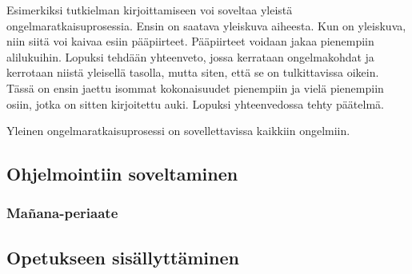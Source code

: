 Esimerkiksi tutkielman kirjoittamiseen voi soveltaa yleistä
ongelmaratkaisuprosessia. Ensin on saatava yleiskuva aiheesta. Kun on yleiskuva,
niin siitä voi kaivaa esiin pääpiirteet. Pääpiirteet voidaan jakaa pienempiin
alilukuihin. Lopuksi tehdään yhteenveto, jossa kerrataan ongelmakohdat ja
kerrotaan niistä yleisellä tasolla, mutta siten, että se on tulkittavissa
oikein. Tässä on ensin jaettu isommat kokonaisuudet pienempiin ja vielä
pienempiin osiin, jotka on sitten kirjoitettu auki. Lopuksi yhteenvedossa tehty
päätelmä.

Yleinen ongelmaratkaisuprosessi on sovellettavissa kaikkiin ongelmiin.

\subsection{Ohjelmointiin soveltaminen}

\subsubsection{Mañana-periaate}


\subsection{Opetukseen sisällyttäminen}

